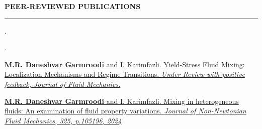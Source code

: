 \documentclass[10pt]{article}
\begin{document}
		\vspace{2.5mm}
		\noindent \textbf{\color{violet} PEER-REVIEWED PUBLICATIONS}
		
		\vspace{-2mm}
		
		\noindent\rule[0.5ex]{\linewidth}{1pt}
		
		
		
		.
		
		.
		
		\noindent \href{https://arxiv.org/pdf/2503.09359}{\textbf{M.R. Daneshvar Garmroodi} and I. Karimfazli. Yield-Stress Fluid Mixing: Localization Mechanisms and Regime Transitions.\textit{ Under Review with positive feedback, Journal of Fluid Mechanics.}}
		
		\noindent \href{https://doi.org/10.1016/j.jnnfm.2024.105196}{\textbf{M.R. Daneshvar Garmroodi} and I. Karimfazli. Mixing in heterogeneous fluids: An examination of fluid property variations.\textit{ Journal of Non-Newtonian Fluid Mechanics, 325, p.105196, 2024}}
		
		
		
		
		
\end{document}
